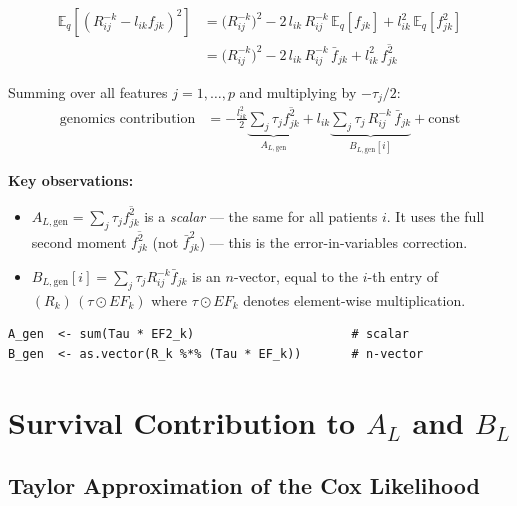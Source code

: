 \documentclass[11pt]{article}
\newcommand{\fbar}[2]{\bar{f}_{#1#2}}
\newcommand{\fsec}[2]{\overline{f^2_{#1#2}}}
\newcommand{\Rk}[0]{R^{-k}}
\begin{document}
\begin{derivbox}
\begin{align*}
  \mathbb{E}_q\!\left[(\Rk_{ij} - l_{ik}f_{jk})^2\right]
  &= \bigl(\Rk_{ij}\bigr)^2 - 2\,l_{ik}\,\Rk_{ij}\,\mathbb{E}_q[f_{jk}]
     + l_{ik}^2\,\mathbb{E}_q[f_{jk}^2] \\
  &= \bigl(\Rk_{ij}\bigr)^2 - 2\,l_{ik}\,\Rk_{ij}\,\fbar{j}{k}
     + l_{ik}^2\,\fsec{j}{k}
\end{align*}

Summing over all features $j=1,\ldots,p$ and multiplying by $-\tau_j/2$:
\begin{align}
  \text{genomics contribution}
  &= -\frac{l_{ik}^2}{2}\underbrace{\sum_j \tau_j\fsec{j}{k}}_{A_{L,\text{gen}}}
     + l_{ik}\underbrace{\sum_j \tau_j\,\Rk_{ij}\,\fbar{j}{k}}_{B_{L,\text{gen}}[i]}
     + \text{const}
  \label{eq:genomics-AB}
\end{align}
\end{derivbox}

\textbf{Key observations:}
\begin{itemize}
  \item $A_{L,\text{gen}} = \sum_j \tau_j\fsec{j}{k}$ is a \emph{scalar} — the same
    for all patients $i$.  It uses the full second moment $\overline{f^2_{jk}}$
    (not $\bar{f}_{jk}^2$) — this is the error-in-variables correction.
  \item $B_{L,\text{gen}}[i] = \sum_j \tau_j\Rk_{ij}\fbar{j}{k}$ is an $n$-vector,
    equal to the $i$-th entry of $(R_k)\,(\tau \odot EF_k)$ where $\tau \odot EF_k$
    denotes element-wise multiplication.
\end{itemize}

\begin{codebox}
\begin{verbatim}
A_gen  <- sum(Tau * EF2_k)                      # scalar
B_gen  <- as.vector(R_k %*% (Tau * EF_k))       # n-vector
\end{verbatim}
\end{codebox}

\section{Survival Contribution to $A_L$ and $B_L$}\label{sec:survival}

\subsection{Taylor Approximation of the Cox Likelihood}
\end{document}

